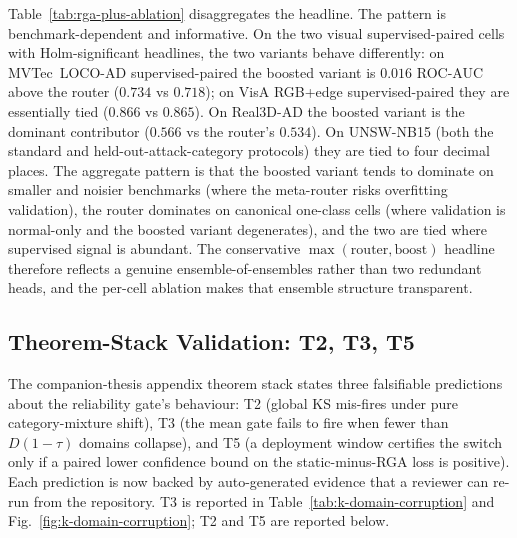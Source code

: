 \documentclass[10pt,conference]{IEEEtran}
\begin{document}
Table~\ref{tab:rga-plus-ablation} disaggregates the headline. The
pattern is benchmark-dependent and informative. On the two visual
supervised-paired cells with Holm-significant headlines, the two
variants behave differently: on MVTec~LOCO-AD supervised-paired the
boosted variant is $0.016$ ROC-AUC above the router ($0.734$ vs
$0.718$); on VisA RGB+edge supervised-paired they are essentially tied
($0.866$ vs $0.865$). On Real3D-AD the boosted variant is the dominant
contributor ($0.566$ vs the router's $0.534$). On UNSW-NB15 (both the
standard and held-out-attack-category protocols) they are tied to four
decimal places. The aggregate pattern is that the boosted variant
tends to dominate on smaller and noisier benchmarks (where the
meta-router risks overfitting validation), the router dominates on
canonical one-class cells (where validation is normal-only and the
boosted variant degenerates), and the two are tied where supervised
signal is abundant. The conservative
$\max(\text{router}, \text{boost})$ headline therefore reflects a
genuine ensemble-of-ensembles rather than two redundant heads, and
the per-cell ablation makes that ensemble structure transparent.

\subsection{Theorem-Stack Validation: T2, T3, T5}
\label{sec:theorem-validation}

The companion-thesis appendix theorem stack states three falsifiable
predictions about the reliability gate's behaviour: T2 (global KS
mis-fires under pure category-mixture shift), T3 (the mean gate fails
to fire when fewer than $D(1-\tau)$ domains collapse), and T5 (a
deployment window certifies the switch only if a paired lower
confidence bound on the static-minus-RGA loss is positive). Each
prediction is now backed by auto-generated evidence that a reviewer
can re-run from the repository. T3 is reported in
Table~\ref{tab:k-domain-corruption} and Fig.~\ref{fig:k-domain-corruption};
T2 and T5 are reported below.

\end{document}
